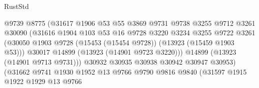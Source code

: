 \begin{lexlean}{RustStd}
\begin{coremodule}
                                      @9739
                                      @8775
                                      (@31617
                                        @1906
                                        @53
                                        @55
                                        @3869
                                        @9731
                                        @9738
                                        @3255
                                        @9712
                                        @3261
                                        @30090
                                        (@31616
                                          @1904
                                          @103
                                          @53
                                          @16
                                          @9728
                                          @3220
                                          @3234
                                          @3255
                                          @9722
                                          @3261
                                          (@30050
                                            @1903
                                            @9728
                                            (@15453 (@15454 @9728))
                                            (@13923 (@15459 @1903 @53)))
                                          @30017
                                          @14899
                                          (@13923 (@14901 @9723 @3220)))
                                        @14899
                                        (@13923 (@14901 @9713 @9731)))
                                      @30932
                                      @30935
                                      @30938
                                      @30942
                                      @30947
                                      @30953)
                                    (@31662
                                      @9741
                                      @1930
                                      @1952
                                      @13
                                      @9766
                                      @9790
                                      @9816
                                      @9840
                                      (@31597
                                        @1915
                                        @1922
                                        @1929
                                        @13
                                        @9766

\end{coremodule}
\end{lexlean}
